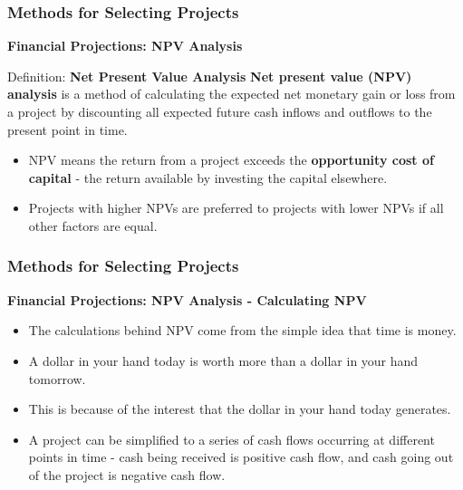 \documentclass[aspectratio=169]{beamer}
\begin{document}
\begin{frame}
\frametitle{Methods for Selecting Projects}
\textbf{Financial Projections: NPV Analysis}
\vspace{0.5cm}
\begin{block}{Definition: \textbf{Net Present Value Analysis}}
\textbf{Net present value (NPV) analysis} is a method of calculating the expected net monetary gain or loss from a project by discounting all expected future cash inflows and outflows to the present point in time.
\end{block}
\vspace{0.5cm}
\begin{itemize}
\item NPV means the return from a project exceeds the \textbf{opportunity cost of capital} - the return available by investing the capital elsewhere.
\item Projects with higher NPVs are preferred to projects with lower NPVs if all other factors are equal.
\end{itemize}
\end{frame}
\begin{frame}
\frametitle{Methods for Selecting Projects}
\textbf{Financial Projections: NPV Analysis - Calculating NPV}
\vspace{0.5cm}
\begin{itemize}
\item The calculations behind NPV come from the simple idea that time is money.
\item A dollar in your hand today is worth more than a dollar in your hand tomorrow.
\item This is because of the interest that the dollar in your hand today generates.
\item A project can be simplified to a series of cash flows occurring at different points in time - cash being received is positive cash flow, and cash going out of the project is negative cash flow.
\end{itemize}
\end{frame}
\end{document}
